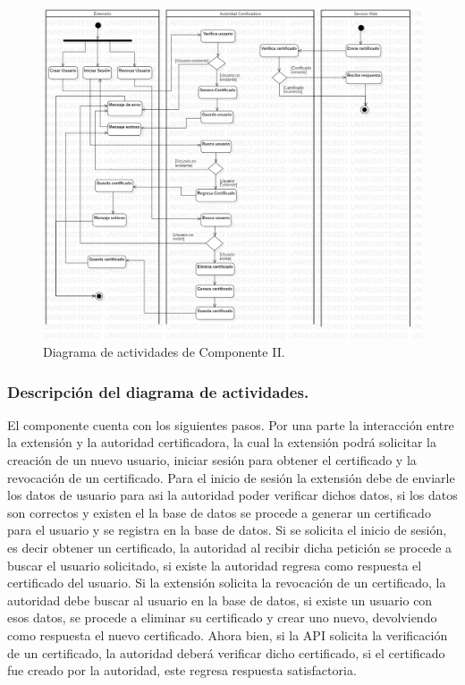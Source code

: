 \documentclass[12pt, a4paper, titlepage]{report}
\begin{document}
        	    \begin{figure}[H]
                	\begin{center}	\includegraphics[width=13cm]{./imagenes/Disenio/Componente_2/CII_DA.png}
                	\caption{Diagrama de actividades de Componente II.}
                	\end{center}
        		\end{figure}
		
        		\subsubsection{Descripción del diagrama de actividades.}
        		El componente cuenta con los siguientes pasos.
        		Por una parte la interacción entre la extensión y la autoridad certificadora, la cual la extensión podrá solicitar la creación de un nuevo usuario, iniciar sesión para obtener el certificado y la revocación de un certificado. Para el inicio de sesión la extensión debe de enviarle los datos de usuario para asi la autoridad poder verificar dichos datos, si los datos son correctos y existen el la base de datos se procede a generar un certificado para el usuario y se registra en la base de datos. Si se solicita el inicio de sesión, es decir obtener un certificado, la autoridad al recibir dicha petición se procede a buscar el usuario solicitado, si existe la autoridad regresa como respuesta el certificado del usuario. Si la extensión solicita la revocación de un certificado, la autoridad debe buscar al usuario en la base de datos, si existe un usuario con esos datos, se procede a eliminar su certificado y crear uno nuevo, devolviendo como respuesta el nuevo certificado. Ahora bien, si la API solicita la verificación de un certificado, la autoridad deberá verificar dicho certificado, si el certificado fue creado por la autoridad, este regresa respuesta satisfactoria.
	
\end{document}
